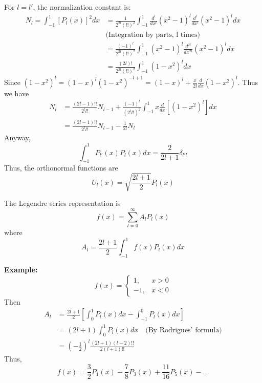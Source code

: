 \documentclass{article}
\begin{document}
	For $l=l'$, the normalization constant is:
	\begin{align}
		N_l = \int_{-1}^{1} [P_l(x)]^2 dx &= \frac{1}{2^{2l}(l!)^2} \int_{-1}^{1} \frac{d^l}{dx^l}(x^2-1)^l \frac{d^l}{dx^l}(x^2-1)^l dx \\
		&\text{(Integration by parts, l times)} \nonumber \\
		&= \frac{(-1)^l}{2^{2l}(l!)^2} \int_{-1}^{1} (x^2-1)^l \frac{d^{2l}}{dx^{2l}}(x^2-1)^l dx \\
		&= \frac{(2l)!}{2^{2l}(l!)^2} \int_{-1}^{1} (1-x^2)^l dx
	\end{align}
	Since $(1-x^2)^l = (1-x)^l (1-x^2)^{-l+1} = (1-x)^l + \frac{x}{2l}\frac{d}{dx}(1-x^2)^l$.
	Thus we have
	\begin{align}
		N_l &= \frac{(2l-1)!!}{2^l l!} N_{l-1} + \frac{(-1)^l}{(2^l l!)^2} \int_{-1}^{1} x \frac{d}{dx}[(1-x^2)^l] dx \\
		&= \frac{(2l-1)!!}{2^l l!} N_{l-1} - \frac{1}{2l} N_l
	\end{align}
	Anyway,
	\begin{equation}
		\int_{-1}^{1} P_{l'}(x) P_l(x) dx = \frac{2}{2l+1} \delta_{l'l}
	\end{equation}
	Thus, the orthonormal functions are
	\begin{equation}
		U_l(x) = \sqrt{\frac{2l+1}{2}} P_l(x)
	\end{equation}
	
	The Legendre series representation is
	\begin{equation}
		f(x) = \sum_{l=0}^{\infty} A_l P_l(x)
	\end{equation}
	where
	\begin{equation}
		A_l = \frac{2l+1}{2} \int_{-1}^{1} f(x) P_l(x) dx
	\end{equation}
	
	\textbf{Example:}
	\begin{equation}
		f(x) = \begin{cases} 1, & x>0 \\ -1, & x<0 \end{cases}
	\end{equation}
	Then
	\begin{align}
		A_l &= \frac{2l+1}{2} \left[ \int_{0}^{1} P_l(x) dx - \int_{-1}^{0} P_l(x) dx \right] \\
		&= (2l+1) \int_{0}^{1} P_l(x) dx \quad \text{(By Rodrigues' formula)} \\
		&= \left(-\frac{1}{2}\right)^l \frac{(2l+1)(l-2)!!}{2(l+1)!!}
	\end{align}
	Thus,
	\begin{equation}
		f(x) = \frac{3}{2}P_1(x) - \frac{7}{8}P_3(x) + \frac{11}{16}P_5(x) - \dots
	\end{equation}
	
\end{document}
